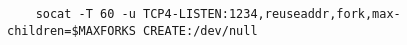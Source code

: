 
\begin{lstlisting}
    socat -T 60 -u TCP4-LISTEN:1234,reuseaddr,fork,max-children=$MAXFORKS CREATE:/dev/null
\end{lstlisting}
